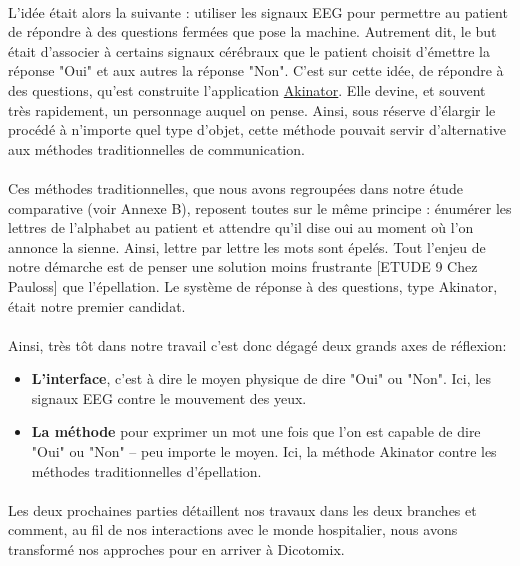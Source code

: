 \documentclass[11pt,a4paper]{article}
\theoremstyle{plain}
\theoremstyle{definition}
\begin{document}
\paragraph{} L'idée était alors la suivante : utiliser les signaux EEG pour permettre au patient de répondre à des questions fermées que pose la machine.
Autrement dit, le but était d'associer à certains signaux cérébraux que le patient choisit d'émettre la réponse "Oui" et aux autres la réponse "Non". 
C'est sur cette idée, de répondre à des questions, qu'est construite l'application \href{http://fr.akinator.com/}{Akinator}. Elle devine, et souvent très rapidement, 
un personnage auquel on pense. Ainsi, sous réserve d'élargir le procédé à n'importe quel type d'objet, cette méthode pouvait servir d'alternative aux méthodes traditionnelles de communication.

\paragraph{} Ces méthodes traditionnelles, que nous avons regroupées dans notre étude comparative (voir Annexe B), reposent toutes sur le même principe : énumérer les
lettres de l'alphabet au patient et attendre qu'il dise oui au moment où l'on annonce la sienne. Ainsi, lettre par lettre les mots sont épelés. Tout l'enjeu de notre démarche est de penser une solution moins frustrante [ETUDE 9 Chez Pauloss] que l'épellation. Le système de réponse à des questions, type Akinator, était notre premier candidat.

\paragraph{} Ainsi, très tôt dans notre travail c'est donc dégagé deux grands axes de réflexion:
\begin{itemize}
\item \textbf{L'interface}, c'est à dire le moyen physique de dire "Oui" ou "Non". Ici, les signaux EEG contre le mouvement des yeux.
\item \textbf{La méthode} pour exprimer un mot une fois que l'on est capable de dire "Oui" ou "Non" -- peu importe le moyen. Ici, la méthode Akinator contre 
les méthodes traditionnelles d'épellation.
\end{itemize}

\paragraph{} Les deux prochaines parties détaillent nos travaux dans les deux branches et comment, au fil de nos interactions avec le monde hospitalier, nous avons transformé nos approches
pour en arriver à Dicotomix.
\end{document}
